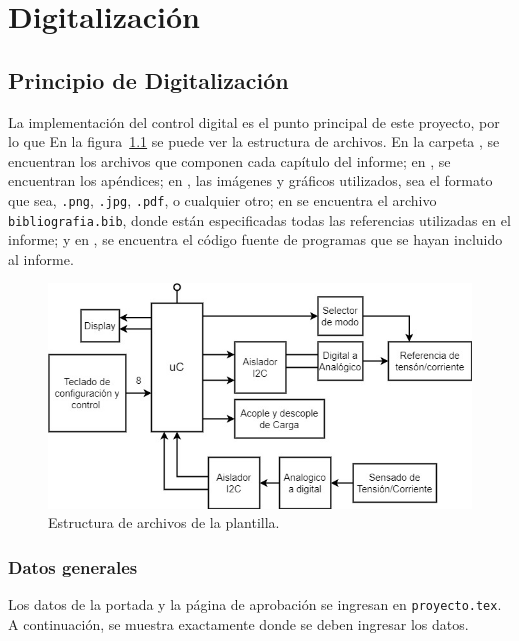 \chapter{Digitalización}

\label{C:Digitalización y control}

\section{Principio de Digitalización}
La implementación del control digital es el punto principal de este proyecto, por lo que 
En la figura~\ref{F:estructura_archivos} se puede ver la estructura de archivos. En la carpeta , se encuentran los archivos que componen cada capítulo del informe; en , se encuentran los apéndices; en , las imágenes y gráficos utilizados, sea el formato que sea, \texttt{.png}, \texttt{.jpg}, \texttt{.pdf}, o cualquier otro; en  se encuentra el archivo \texttt{bibliografia.bib}, donde están especificadas todas las referencias utilizadas en el informe; y en , se encuentra el código fuente de programas que se hayan incluido al informe.

\begin{figure}
    \centering
    \includegraphics[scale=0.8]{./imagenes/digitaldigital.jpg}
    \caption{Estructura de archivos de la plantilla.}
    \label{F:estructura_archivos}
\end{figure}

\subsection{Datos generales}
Los datos de la portada y la página de aprobación se ingresan en \texttt{proyecto.tex}. A continuación, se muestra exactamente donde se deben ingresar los datos.

\lipsum[5-6]


